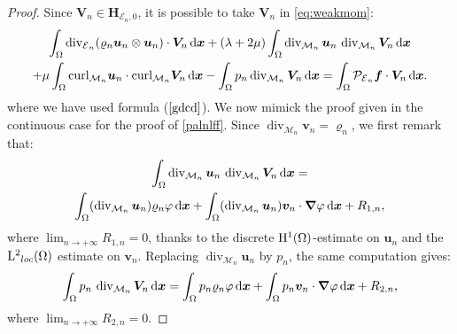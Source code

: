 \documentclass{amsart}
\numberwithin{equation}{section}
\begin{document}
\begin{proof}
Since $ {\bm{V}}_n  \in {{\mathbf{H}_{{{\mathcal E}}_n,0}}}$, it is possible to take ${\bm{V}}_n$ in \eqref{eq:weakmom}: 
\begin{multline}
\int_\Omega \operatorname{div}_{\operatorname{{\mathcal{E}}}_n}({\varrho}_n {{\boldsymbol u}}_n \otimes {{\boldsymbol u}}_n) \cdot {\bm{V}}_n {\, {\rm d}{{\boldsymbol x}}} + (\lambda+2\mu) \int_\Omega \operatorname{div}_{{{\mathcal M}}_n}  {{\boldsymbol u}}_n \, \operatorname{div}_{{{\mathcal M}}_n}   {\bm{V}}_n {\, {\rm d}{{\boldsymbol x}}}
\\+\mu \int_\Omega {{\rm curl}}_{{{\mathcal M}}_n}  {{\boldsymbol u}}_n  \cdot {{\rm curl}}_{{{\mathcal M}}_n}  {\bm{V}}_n {\, {\rm d}{{\boldsymbol x}}}
 - \int_\Omega  p_n \operatorname{div}_{{{\mathcal M}}_n}   {\bm{V}}_n {\, {\rm d}{{\boldsymbol x}}}
= \int _\Omega {\mathcal{P}}_{\operatorname{{\mathcal{E}}}_n} \bm{f} \cdot  {\bm{V}}_n {\, {\rm d}{{\boldsymbol x}}}.
\label{lim} \end{multline}
where we have used formula ($\ref{gdcd}$).
We now mimick the proof given in the continuous case for the proof of \eqref{palnlff}. 
Since $\operatorname{div}_{{{\mathcal M}}_n}  {{\boldsymbol v}}_n={\varrho}_n$, we first remark that:
\begin{multline}
\int_\Omega  \operatorname{div}_{{{\mathcal M}}_n}  {{\boldsymbol u}}_n \, \operatorname{div}_{{{\mathcal M}}_n}   {\bm{V}}_n {\, {\rm d}{{\boldsymbol x}}} = 
\\
\int_\Omega  (\operatorname{div}_{{{\mathcal M}}_n} {{\boldsymbol u}}_n)  {\varrho}_n \varphi {\, {\rm d}{{\boldsymbol x}}} 
+ \int_\Omega ( \operatorname{div}_{{{\mathcal M}}_n} {{\boldsymbol u}}_n) {{\boldsymbol v}}_n \cdot {{\boldsymbol \nabla}} \varphi {\, {\rm d}{{\boldsymbol x}}} +R_{1,n},
\label{limd}
\end{multline}
where $\lim_{{n {\rightarrow} + \infty}} R_{1,n} =0$, thanks to the discrete ${{\rm H}^{1}}(\Omega)$-estimate on ${{\boldsymbol u}}_n$ and the ${{\rm L}^{2}}_{loc}(\Omega)$ estimate on ${{\boldsymbol v}}_n$.
Replacing $\operatorname{div}_{{{\mathcal M}}_n}{{\boldsymbol u}}_n$ by $p_n$, the same computation gives:
\begin{equation}
\int_\Omega p_n \,  \operatorname{div}_{{{\mathcal M}}_n}  {\bm{V}}_n {\, {\rm d}{{\boldsymbol x}}} = \int_\Omega  p_n  {\varrho}_n \varphi {\, {\rm d}{{\boldsymbol x}}} 
+ \int_\Omega p_n {{\boldsymbol v}}_n \cdot {{\boldsymbol \nabla}} \varphi {\, {\rm d}{{\boldsymbol x}}} +R_{2,n},
\label{limp}\end{equation}
where $\lim_{{n {\rightarrow} + \infty}} R_{2,n} =0$.

\end{proof}
\end{document}
